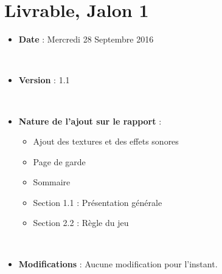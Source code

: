 \documentclass[12pt,a4paper]{report}
\begin{document}
    \section{Livrable, Jalon 1}
    \begin{itemize}
\item \textbf{Date}  : Mercredi 28 Septembre 2016

\par\leavevmode\
\item \textbf{Version}  : 1.1

\par\leavevmode\
\item \textbf{Nature de l'ajout sur le rapport}  : \begin{itemize}\item Ajout des textures et des effets sonores \item Page de garde \item Sommaire \item Section 1.1 : Présentation générale \item Section 2.2 : Règle du jeu \end{itemize}

\par\leavevmode\
\item \textbf{Modifications}  : Aucune modification pour l'instant.\end{itemize}
    
    
\end{document}
